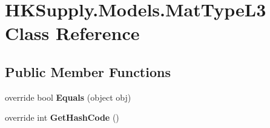 \hypertarget{class_h_k_supply_1_1_models_1_1_mat_type_l3}{}\section{H\+K\+Supply.\+Models.\+Mat\+Type\+L3 Class Reference}
\label{class_h_k_supply_1_1_models_1_1_mat_type_l3}
\subsection*{Public Member Functions}
\begin{DoxyCompactItemize}
\item 
\mbox{\label{class_h_k_supply_1_1_models_1_1_mat_type_l3_af5d2f8205999fa89a799b010d3a9efa0}} 
override bool {\bfseries Equals} (object obj)
\item 
\mbox{\label{class_h_k_supply_1_1_models_1_1_mat_type_l3_ae126f0e32a936aefc1bc1f9014b9ae28}} 
override int {\bfseries Get\+Hash\+Code} ()
\end{DoxyCompactItemize}
